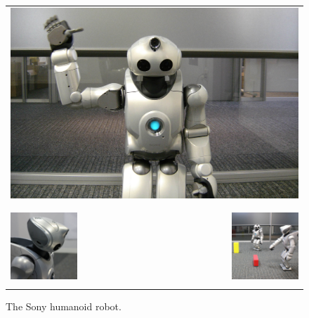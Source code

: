 \begin{figure}[p]
  \begin{tabular}{lr}
    \multicolumn{2}{l}{\includegraphics[width=1\textwidth]{figures/photo-qrio-1}} \\
    & \\
    & \\
    \includegraphics[width=0.48\textwidth]{figures/photo-qrio-3} &
    \includegraphics[width=0.48\textwidth]{figures/photo-qrio-2} \\
    & \\
  \end{tabular}
  \caption{The Sony humanoid robot.}
  \label{f:photo-qrio}
\end{figure}


